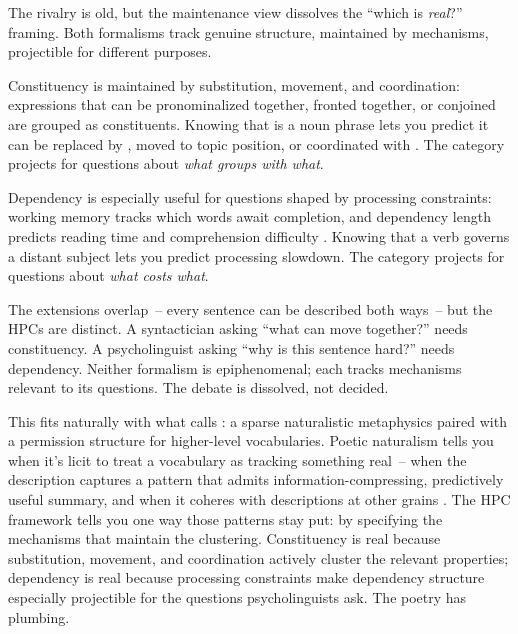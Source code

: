 The rivalry is old, but the maintenance view dissolves the \enquote{which is \emph{real}?} framing. Both formalisms track genuine structure, maintained by mechanisms, projectible for different purposes.

Constituency is maintained by substitution, movement, and coordination: expressions that can be pronominalized together, fronted together, or conjoined are grouped as constituents. Knowing that  is a noun phrase lets you predict it can be replaced by , moved to topic position, or coordinated with . The category projects for questions about \emph{what groups with what}.

Dependency is especially useful for questions shaped by processing constraints: working memory tracks which words await completion, and dependency length predicts reading time and comprehension difficulty \citep{gibson2000,futrell2020}. Knowing that a verb governs a distant subject lets you predict processing slowdown. The category projects for questions about \emph{what costs what}.

The extensions overlap~-- every sentence can be described both ways~-- but the HPCs are distinct. A syntactician asking \enquote{what can move together?} needs constituency. A psycholinguist asking \enquote{why is this sentence hard?} needs dependency. Neither formalism is epiphenomenal; each tracks mechanisms relevant to its questions. The debate is dissolved, not decided.

This fits naturally with what \textcite{carroll2016} calls : a sparse naturalistic metaphysics paired with a permission structure for higher-level vocabularies. Poetic naturalism tells you when it's licit to treat a vocabulary as tracking something real~-- when the description captures a pattern that admits information-compressing, predictively useful summary, and when it coheres with descriptions at other grains \citep{dennett1991}. The HPC framework tells you one way those patterns stay put: by specifying the mechanisms that maintain the clustering. Constituency is real because substitution, movement, and coordination actively cluster the relevant properties; dependency is real because processing constraints make dependency structure especially projectible for the questions psycholinguists ask. The poetry has plumbing.

